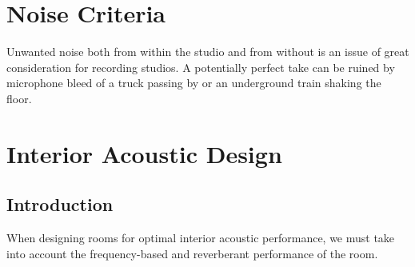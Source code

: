 \documentclass[10pt, twocolumn]{article}
\begin{document}
    \section{Noise Criteria}
        Unwanted noise both from within the studio and from without is an issue of great consideration for recording studios.
        A potentially perfect take can be ruined by microphone bleed of a truck passing by or an underground train shaking the floor.
        


    \section{Interior Acoustic Design}
        \subsection{Introduction}
            When designing rooms for optimal interior acoustic performance, we must take into account the frequency-based and reverberant performance of the room.
\end{document}
